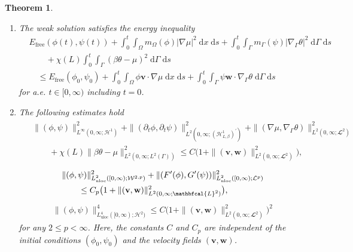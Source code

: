 \documentclass[10pt,reqno]{amsart}
\newtheorem{theorem}{Theorem}[section]
\theoremstyle{remark}
\numberwithin{equation}{section}
\newcommand{\abs}[1]{| #1 |}
\newcommand{\norm}[1]{\| #1 \|}
\newcommand{\bv}{\mathbf{v}}
\newcommand{\bw}{\mathbf{w}}
\newcommand{\intO}{\int_\Omega}
\newcommand{\intG}{\int_\Gamma}
\newcommand{\dxs}{\;\mathrm{d}x\;\mathrm{d}s}
\newcommand{\dGs}{\;\mathrm{d}\Ga\;\mathrm{d}s}
\newcommand{\delt}{\partial_{t}}
\newcommand{\Grad}{\nabla}
\newcommand{\Gradg}{\nabla_\Ga}
\newcommand{\Om}{\Omega}
\newcommand{\Ga}{\Gamma}
\begin{document}
\begin{theorem}
\begin{enumerate}[label=\textnormal{(\roman*)}, topsep=0ex, leftmargin=*, itemsep=1.5ex]
        for all $t\in[0,\infty)$.
        \item \label{CCH:WS:EnergyIneq} The weak solution satisfies the energy inequality
        \begin{align}\label{CCH:EnergyIneq}
            &E_{\mathrm{free}}(\phi(t),\psi(t)) + \int_0^t\intO m_\Om(\phi)\abs{\Grad\mu}^2\dxs + \int_0^t\intG m_\Ga(\psi)\abs{\Gradg\theta}^2\dGs \nonumber \\
            &\qquad + \chi(L)\int_0^t\intG (\beta\theta - \mu)^2\dGs \\
            &\quad \leq E_{\mathrm{free}}(\phi_0,\psi_0) + \int_0^t\intO \phi\bv\cdot\Grad\mu\dxs + \int_0^t\intG \psi\bw\cdot\Gradg\theta\dGs \nonumber
        \end{align}
        for a.e. $t\in[0,\infty)$ including $t = 0$.
        \item \label{CCH:WS:EnergyEstimates} The following estimates hold 
        \begin{align}\label{CCH:Est:Energy:Thm}
            \begin{split}
                &\norm{(\phi,\psi)}_{L^\infty(0,\infty;\mathcal{H}^1)}^2 + \norm{(\delt\phi,\delt\psi)}_{L^2(0,\infty;(\mathcal{H}^1_{L,\beta})^\prime)}^2 + \norm{(\Grad\mu,\Gradg\theta)}_{L^2(0,\infty;\mathbfcal{L}^2)}^2 \\
                &\qquad + \chi(L)\norm{\beta\theta - \mu}^2_{L^2(0,\infty;L^2(\Ga))} \leq C\big(1 + \norm{(\bv,\bw)}_{L^2(0,\infty;\mathbfcal{L}^2)}^2 \big),
            \end{split}
        \end{align}
        \vspace{-.5em}
        \begin{align}\label{CCH:Est:L^p:Thm}
            \begin{split}
                &\norm{(\phi,\psi)}_{L^2_{\mathrm{uloc}}([0,\infty);\mathcal{W}^{2,p})}^2 + \norm{(F^\prime(\phi),G^\prime(\psi))}_{L^2_{\mathrm{uloc}}([0,\infty);\mathcal{L}^p)}^2 \\
                &\qquad\leq C_p\big(1 + \norm{(\bv,\bw)}_{L^2(0,\infty;\mathbfcal{L}^2)}^2\big), \hspace{-2em}
            \end{split}
        \end{align}
        \vspace{-.5em}
        \begin{align}\label{CCH:Est:H^2:Thm}
            \norm{(\phi,\psi)}_{L^4_{\mathrm{uloc}}([0,\infty);\mathcal{H}^2)}^4 \leq C\big(1 + \norm{(\bv,\bw)}_{L^2(0,\infty;\mathbfcal{L}^2)}^2\big)^2
        \end{align}
        for any $2 \leq p < \infty$. Here, the constants $C$ and $C_p$ are independent of the initial conditions $(\phi_0,\psi_0)$ and the velocity fields $(\bv,\bw)$.
    \end{enumerate}
\end{theorem}
\end{document}
